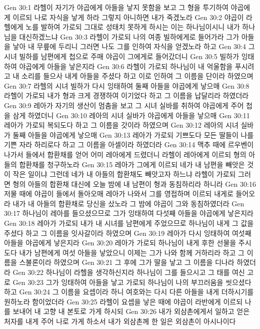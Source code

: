 Gen 30:1  라헬이 자기가 야곱에게 아들을 낳지 못함을 보고 그 형을 투기하여 야곱에게 이르되 나로 자식을 낳게 하라 그렇지 아니하면 내가 죽겠노라
Gen 30:2  야곱이 라헬에게 노를 발하여 가로되 그대로 성태치 못하게 하시는 이는 하나님이시니 내가 하나님을 대신하겠느냐
Gen 30:3  라헬이 가로되 나의 여종 빌하에게로 들어가라 그가 아들을 낳아 내 무릎에 두리니 그러면 나도 그를 인하여 자식을 얻겠노라 하고
Gen 30:4  그 시녀 빌하를 남편에게 첩으로 주매 야곱이 그에게로 들어갔더니
Gen 30:5  빌하가 잉태하여 야곱에게 아들을 낳은지라
Gen 30:6  라헬이 가로되 하나님이 내 억울함을 푸시려고 내 소리를 들으사 내게 아들을 주셨다 하고 이로 인하여 그 이름을 단이라 하였으며
Gen 30:7  라헬의 시녀 빌하가 다시 잉태하여 둘째 아들을 야곱에게 낳으매
Gen 30:8  라헬이 가로되 내가 형과 크게 경쟁하여 이기었다 하고 그 이름을 납달리라 하였더라
Gen 30:9  레아가 자기의 생산이 멈춤을 보고 그 시녀 실바를 취하여 야곱에게 주어 첩을 삼게 하였더니
Gen 30:10  레아의 시녀 실바가 야곱에게 아들을 낳으매
Gen 30:11  레아가 가로되 복되도다 하고 그 이름을 갓이라 하였으며
Gen 30:12  레아의 시녀 실바가 둘째 아들을 야곱에게 낳으매
Gen 30:13  레아가 가로되 기쁘도다 모든 딸들이 나를 기쁜 자라 하리로다 하고 그 이름을 아셀이라 하였더라
Gen 30:14  맥추 때에 르우벤이 나가서 들에서 합환채를 얻어 어미 레아에게 드렸더니 라헬이 레아에게 이르되 형의 아들의 합환채를 청구하노라
Gen 30:15  레아가 그에게 이르되 네가 내 남편을 빼앗은 것이 작은 일이냐 그런데 네가 내 아들의 합환채도 빼앗고자 하느냐 라헬이 가로되 그러면 형의 아들의 합환채 대신에 오늘 밤에 내 남편이 형과 동침하리라 하니라
Gen 30:16  저물 때에 야곱이 들에서 돌아오매 레아가 나와서 그를 영접하며 이르되 내게로 들어오라 내가 내 아들의 합환채로 당신을 샀노라 그 밤에 야곱이 그와 동침하였더라
Gen 30:17  하나님이 레아를 들으셨으므로 그가 잉태하여 다섯째 아들을 야곱에게 낳은지라
Gen 30:18  레아가 가로되 내가 내 시녀를 남편에게 주었으므로 하나님이 내게 그 값을 주셨다 하고 그 이름을 잇사갈이라 하였으며
Gen 30:19  레아가 다시 잉태하여 여섯째 아들을 야곱에게 낳은지라
Gen 30:20  레아가 가로되 하나님이 내게 후한 선물을 주시도다 내가 남편에게 여섯 아들을 낳았으니 이제는 그가 나와 함께 거하리라 하고 그 이름을 스불론이라 하였으며
Gen 30:21  그 후에 그가 딸을 낳고 그 이름을 디나라 하였더라
Gen 30:22  하나님이 라헬을 생각하신지라 하나님이 그를 들으시고 그 태를 여신 고로
Gen 30:23  그가 잉태하여 아들을 낳고 가로되 하나님이 나의 부끄러움을 씻으셨다 하고
Gen 30:24  그 이름을 요셉이라 하니 여호와는 다시 다른 아들을 내게 더하시기를 원하노라 함이었더라
Gen 30:25  라헬이 요셉을 낳은 때에 야곱이 라반에게 이르되 나를 보내어 내 고향 내 본토로 가게 하시되
Gen 30:26  내가 외삼촌에게서 일하고 얻은 처자를 내게 주어 나로 가게 하소서 내가 외삼촌께 한 일은 외삼촌이 아시나이다
